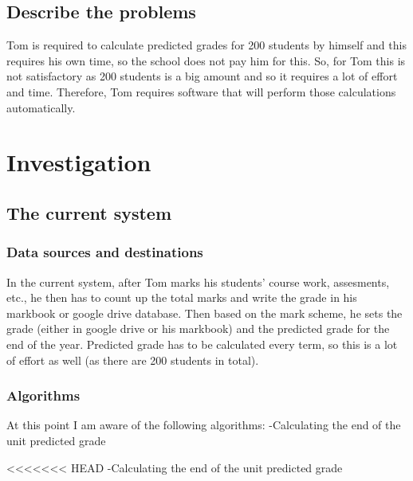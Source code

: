 \subsection{Describe the problems}

Tom is required to calculate predicted grades for 200 students by himself and this requires his own time, so the school does not pay him for this. So, for Tom this is not satisfactory as 200 students is a big amount and so it requires a lot of effort and time. Therefore, Tom requires software that will perform those calculations automatically. 

\section{Investigation}

\subsection{The current system}
\subsubsection{Data sources and destinations}

In the current system, after Tom marks his students' course work, assesments, etc., he then has to count up the total marks and write the grade in his markbook or google drive database. Then based on the mark scheme, he sets the grade (either in google drive or his markbook) and the predicted grade for the end of the year. Predicted grade has to be calculated every term, so this is a lot of effort as well (as there are 200 students in total).

\subsubsection{Algorithms}
At this point I am aware of the following algorithms:
-Calculating the end of the unit predicted grade

<<<<<<< HEAD
-Calculating the end of the unit predicted grade

\EndFor
{}

